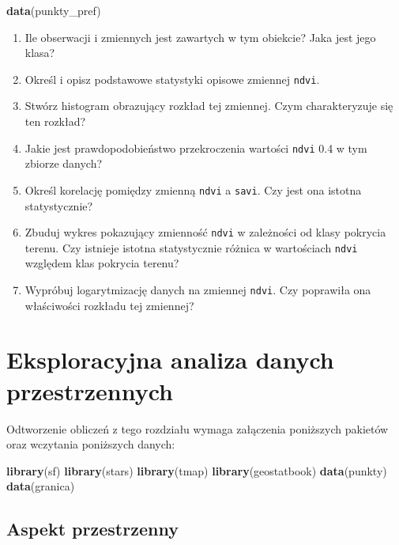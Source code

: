 \documentclass[
  paper=6in:9in,pagesize=pdftex,headinclude=on,footinclude=on,10pt]{scrbook}
\newenvironment{Shaded}{\begin{snugshade}}{\end{snugshade}}
\newcommand{\FunctionTok}[1]{\textcolor[rgb]{0.13,0.29,0.53}{\textbf{#1}}}
\newcommand{\NormalTok}[1]{#1}
\providecommand{\tightlist}{%
  \setlength{\itemsep}{0pt}\setlength{\parskip}{0pt}}
\begin{document}
\begin{Shaded}
\begin{Highlighting}[]
\FunctionTok{data}\NormalTok{(punkty\_pref)}
\end{Highlighting}
\end{Shaded}

\begin{enumerate}
\def\labelenumi{\arabic{enumi}.}
\tightlist
\item
  Ile obserwacji i zmiennych jest zawartych w tym obiekcie?
  Jaka jest jego klasa?
\item
  Określ i opisz podstawowe statystyki opisowe zmiennej \texttt{ndvi}.
\item
  Stwórz histogram obrazujący rozkład tej zmiennej.
  Czym charakteryzuje się ten rozkład?
\item
  Jakie jest prawdopodobieństwo przekroczenia wartości \texttt{ndvi} 0.4 w tym zbiorze danych?
\item
  Określ korelację pomiędzy zmienną \texttt{ndvi} a \texttt{savi}.
  Czy jest ona istotna statystycznie?
\item
  Zbuduj wykres pokazujący zmienność \texttt{ndvi} w zależności od klasy pokrycia terenu.
  Czy istnieje istotna statystycznie różnica w wartościach \texttt{ndvi} względem klas pokrycia terenu?
\item
  Wypróbuj logarytmizację danych na zmiennej \texttt{ndvi}.
  Czy poprawiła ona właściwości rozkładu tej zmiennej?
\end{enumerate}

\chapter{Eksploracyjna analiza danych przestrzennych}\label{eksploracyjna-analiza-danych-przestrzennych}

Odtworzenie obliczeń z tego rozdziału wymaga załączenia poniższych pakietów oraz wczytania poniższych danych:

\begin{Shaded}
\begin{Highlighting}[]
\FunctionTok{library}\NormalTok{(sf)}
\FunctionTok{library}\NormalTok{(stars)}
\FunctionTok{library}\NormalTok{(tmap)}
\FunctionTok{library}\NormalTok{(geostatbook)}
\FunctionTok{data}\NormalTok{(punkty)}
\FunctionTok{data}\NormalTok{(granica)}
\end{Highlighting}
\end{Shaded}

\section{Aspekt przestrzenny}\label{aspekt-przestrzenny}
\end{document}
